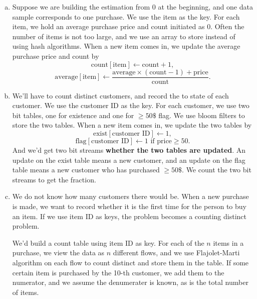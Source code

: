 \documentclass{article}
\begin{document}
\begin{enumerate}[(a)]
	\item Suppose we are building the estimation from 0 at the beginning, and one data sample corresponds to one purchase. We use the item as the key. For each item, we hold an average purchase price and count initiated as 0. Often the number of items is not too large, and we use an array to store instead of using hash algorithms. When a new item comes in, we update the average purchase price and count by
	\[
		\text{count}[\text{item}] \leftarrow \text{count} + 1,
	\]
	\[
		\text{average}[\text{item}] \leftarrow \frac{\text{average}\times(\text{count}-1) + \text{price}}{\text{count}}.
	\]
	\item We'll have to count distinct customers, and record the to state of each customer. We use the customer ID as the key. For each customer, we use two bit tables, one for existence and one for $\geq50\$$ flag. We use bloom filters to store the two tables. When a new item comes in, we update the two tables by
	\[
		\text{exist}[\text{customer ID}] \leftarrow 1,
	\]
	\[
		\text{flag}[\text{customer ID}] \leftarrow 1 \text{ if price} \geq 50.
	\]
	And we'd get two bit streams \textbf{whether the two tables are updated}. An update on the exist table means a new customer, and an update on the flag table means a new customer who has purchased $\geq50\$$. We count the two bit streams to get the fraction.
	\item We do not know how many customers there would be. When a new purchase is made, we want to record whether it is the first time for the person to buy an item.
	If we use item ID as keys, the problem becomes a counting distinct problem. 

	We'd build a count table using item ID as key. For each of the $n$ items in a purchase, we view the data as $n$ different flows, and we use Flajolet-Marti algorithm on each flow to count distinct and store them in the table. 
	If some certain item is purchased by the 10-th customer, we add them to the numerator, and we assume the denumerater is known, as is the total number of items.
\end{enumerate}
\end{document}
